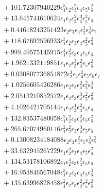 \documentclass[10pt]{article}
\begin{document}
\begin{align*}
&{}  + 101.72307940229 \epsilon_{1}^{3} \epsilon_{2} \epsilon_{3}^{2} \epsilon_{4} \epsilon_{5} \epsilon_{6}^{2} \\
&{}  + 13.645744610624 \epsilon_{1} \epsilon_{2} \epsilon_{3}^{2} \epsilon_{4}^{3} \epsilon_{5}^{2} \epsilon_{6} \\
&{}  + 0.44618243251423 \epsilon_{2} \epsilon_{3} \epsilon_{4} \epsilon_{5}^{3} \epsilon_{6}^{3} \epsilon_{7} \\
&{}  + 118.67692596933 \epsilon_{1}^{3} \epsilon_{2} \epsilon_{3} \epsilon_{4} \epsilon_{5}^{2} \epsilon_{6}^{2} \\
&{}  + 999.49575145915 \epsilon_{1}^{4} \epsilon_{2}^{2} \epsilon_{3} \epsilon_{4} \epsilon_{5} \epsilon_{6} \\
&{}  + 1.9621332119851 \epsilon_{1} \epsilon_{2} \epsilon_{3}^{3} \epsilon_{4}^{2} \epsilon_{5} \epsilon_{6}^{2} \\
&{}  + 0.030807736851872 \epsilon_{2}^{3} \epsilon_{3} \epsilon_{4}^{3} \epsilon_{5} \epsilon_{6} \epsilon_{7} \\
&{}  + 1.0256605426286 \epsilon_{1} \epsilon_{2} \epsilon_{3} \epsilon_{4}^{2} \epsilon_{5}^{2} \epsilon_{6}^{3} \\
&{}  + 2.0513210852572 \epsilon_{1} \epsilon_{2} \epsilon_{3} \epsilon_{4}^{3} \epsilon_{5}^{2} \epsilon_{6}^{2} \\
&{}  + 4.1026421705144 \epsilon_{1} \epsilon_{2} \epsilon_{3}^{4} \epsilon_{4}^{2} \epsilon_{5} \epsilon_{6} \\
&{}  + 132.83537480058 \epsilon_{1}^{2} \epsilon_{2}^{2} \epsilon_{3} \epsilon_{4}^{2} \epsilon_{5} \epsilon_{6}^{2} \\
&{}  + 265.67074960116 \epsilon_{1}^{2} \epsilon_{2}^{2} \epsilon_{3} \epsilon_{4}^{3} \epsilon_{5} \epsilon_{6} \\
&{}  + 0.13008234184088 \epsilon_{2} \epsilon_{3} \epsilon_{4}^{2} \epsilon_{5} \epsilon_{6}^{3} \epsilon_{7}^{2} \\
&{}  + 33.632945267229 \epsilon_{1} \epsilon_{2}^{4} \epsilon_{3} \epsilon_{4} \epsilon_{5} \epsilon_{6}^{2} \\
&{}  + 134.53178106892 \epsilon_{1} \epsilon_{2}^{4} \epsilon_{3} \epsilon_{4}^{2} \epsilon_{5} \epsilon_{6} \\
&{}  + 16.953846567048 \epsilon_{1}^{3} \epsilon_{2} \epsilon_{3} \epsilon_{4} \epsilon_{5} \epsilon_{6}^{3} \\
&{}  + 135.63996828458 \epsilon_{1}^{2} \epsilon_{2} \epsilon_{3} \epsilon_{4}^{2} \epsilon_{5}^{2} \epsilon_{6}^{2} \\

\end{align*}
\end{document}
